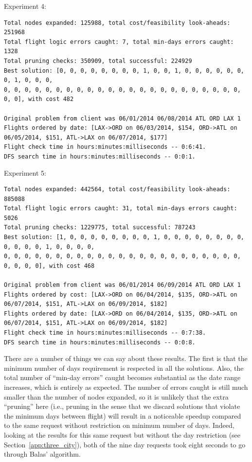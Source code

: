 \documentclass{article}
\begin{document}
Experiment 4:

\scriptsize
\begin{verbatim}
Total nodes expanded: 125988, total cost/feasibility look-aheads: 251968
Total flight logic errors caught: 7, total min-days errors caught: 1328
Total pruning checks: 350909, total successful: 224929
Best solution: [0, 0, 0, 0, 0, 0, 0, 0, 1, 0, 0, 1, 0, 0, 0, 0, 0, 0, 0, 1, 0, 0, 0,
0, 0, 0, 0, 0, 0, 0, 0, 0, 0, 0, 0, 0, 0, 0, 0, 0, 0, 0, 0, 0, 0, 0, 0, 0], with cost 482

Original problem from client was 06/01/2014 06/08/2014 ATL ORD LAX 1
Flights ordered by date: [LAX->ORD on 06/03/2014, $154, ORD->ATL on 06/05/2014, $151, ATL->LAX on 06/07/2014, $177]
Flight check time in hours:minutes:milliseconds -- 0:6:41.
DFS search time in hours:minutes:milliseconds -- 0:0:1.
\end{verbatim}
\normalsize

Experiment 5:

\scriptsize
\begin{verbatim}
Total nodes expanded: 442564, total cost/feasibility look-aheads: 885088
Total flight logic errors caught: 31, total min-days errors caught: 5026
Total pruning checks: 1229775, total successful: 787243
Best solution: [1, 0, 0, 0, 0, 0, 0, 0, 0, 1, 0, 0, 0, 0, 0, 0, 0, 0, 0, 0, 0, 0, 1, 0, 0, 0, 0,
0, 0, 0, 0, 0, 0, 0, 0, 0, 0, 0, 0, 0, 0, 0, 0, 0, 0, 0, 0, 0, 0, 0, 0, 0, 0, 0], with cost 468

Original problem from client was 06/01/2014 06/09/2014 ATL ORD LAX 1
Flights ordered by cost: [LAX->ORD on 06/04/2014, $135, ORD->ATL on 06/07/2014, $151, ATL->LAX on 06/09/2014, $182]
Flights ordered by date: [LAX->ORD on 06/04/2014, $135, ORD->ATL on 06/07/2014, $151, ATL->LAX on 06/09/2014, $182]
Flight check time in hours:minutes:milliseconds -- 0:7:38.
DFS search time in hours:minutes:milliseconds -- 0:0:8.
\end{verbatim}
\normalsize

There are a number of things we can say about these results. The first is that the minimum number of days requirement is respected in all the
solutions. Also, the total number of ``min-day errors'' caught becomes substantial as the date range increases, which is entirely as expected.  The
number of errors caught is still much smaller than the number of nodes expanded, so it is unlikely that the extra ``pruning'' here (i.e., pruning in
the sense that we discard solutions that violate the minimum days between flight) will result in a noticeable speedup compared to the same request
without restriction on minimum number of days. Indeed, looking at the results for this same request but without the day restriction (see
Section~\ref{app:three_city}), both of the nine day requests took eight seconds to go through Balas' algorithm.
\end{document}
